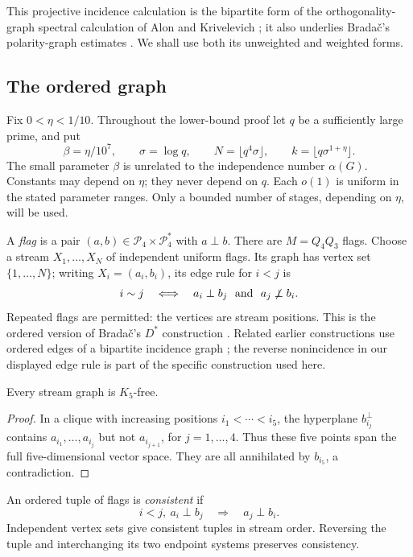 This projective incidence calculation is the bipartite form of the
orthogonality-graph spectral calculation of Alon and Krivelevich
\cite[Section~2]{AlonKrivelevich1997}; it also underlies
Brada\v{c}'s polarity-graph estimates \cite[Lemma~2.1]{Bradac2026}.
We shall use both its unweighted and weighted forms.

\subsection{The ordered graph}

Fix \(0<\eta<1/10\). Throughout the lower-bound proof let \(q\)
be a sufficiently large prime, and put
\[
 \beta=\eta/10^7,\qquad \sigma=\log q,\qquad
 N=\lfloor q^4\sigma\rfloor,\qquad
 k=\lfloor q\sigma^{1+\eta}\rfloor.
\]
The small parameter \(\beta\) is unrelated to the independence number
\(\alpha(G)\). Constants may depend on \(\eta\); they never depend
on \(q\). Each \(o(1)\) is uniform in the stated parameter ranges.
Only a bounded number of stages, depending on \(\eta\), will be used.

A \emph{flag} is a pair \((a,b)\in\mathcal P_4\times\mathcal P_4^*\)
with \(a\perp b\). There are \(M=Q_4Q_3\) flags.
Choose a stream \(X_1,\ldots,X_N\) of independent uniform flags.
Its graph has vertex set \(\{1,\ldots,N\}\); writing
\(X_i=(a_i,b_i)\), its edge rule for \(i<j\) is
\[
 i\sim j
 \quad\Longleftrightarrow\quad
 a_i\perp b_j\ \hbox{ and }\ a_j\not\perp b_i.
\]
Repeated flags are permitted: the vertices are stream positions.
This is the ordered version of Brada\v{c}'s \(D^*\) construction
\cite[Section~2.5]{Bradac2026}.
Related earlier constructions use ordered edges of a bipartite
incidence graph \cite{CodenottiPudlakResta2000,KostochkaPudlakRodl2010};
the reverse nonincidence in our displayed edge rule is part of the
specific construction used here.

\begin{lemma}
\label{lem:clique-free}
Every stream graph is \(K_5\)-free.
\end{lemma}
\begin{proof}
In a clique with increasing positions \(i_1<\cdots<i_5\), the
hyperplane \(b_{i_j}^\perp\) contains
\(a_{i_1},\ldots,a_{i_j}\) but not \(a_{i_{j+1}}\), for
\(j=1,\ldots,4\).
Thus these five points span the full five-dimensional vector space.
They are all annihilated by \(b_{i_5}\), a contradiction.
\end{proof}

An ordered tuple of flags is \emph{consistent} if
\[
 i<j,\ a_i\perp b_j \quad\Longrightarrow\quad a_j\perp b_i.
\]
Independent vertex sets give consistent tuples in stream order.
Reversing the tuple and interchanging its two endpoint systems
preserves consistency.


